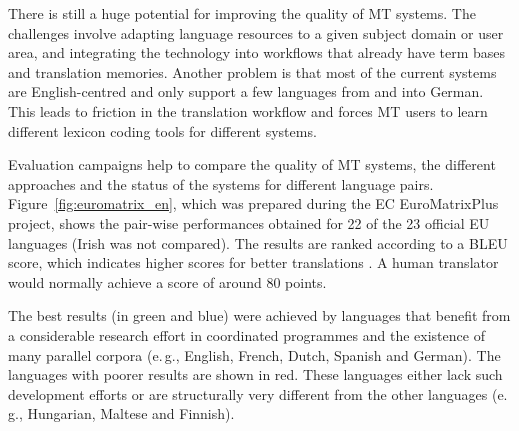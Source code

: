 \begin{multicols}{2}
There is still a huge potential for improving the quality of MT systems. The challenges involve adapting language resources to a given subject domain or user area, and integrating the technology into workflows that already have term bases and translation memories. Another problem is that most of the current systems are English-centred and only support a few languages from and into German. This leads to friction in the translation workflow and forces MT users to learn different lexicon coding tools for different systems.

Evaluation campaigns help to compare the quality of MT systems, the
different approaches and the status of the systems for different
language pairs. Figure~\ref{fig:euromatrix_en},
which was prepared during the EC
EuroMatrixPlus project, shows the pair-wise performances obtained for
22 of the 23 official EU languages (Irish was not compared). The
results are ranked according to a BLEU score, which indicates higher
scores for better translations \cite{bleu1}. A human translator would
normally achieve a score of around 80 points.

The best results (in green and blue) were achieved by languages that
benefit from a considerable research effort in coordinated programmes
and the existence of many parallel corpora (e.\,g., English, French,
Dutch, Spanish and German). The languages with poorer results are
shown in red. These languages either lack such development efforts or
are structurally very different from the other languages (e.\,g.,
Hungarian, Maltese and Finnish).


\end{multicols}

